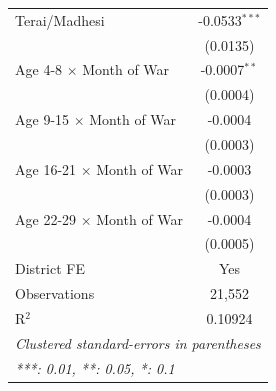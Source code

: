 \begin{tabular}{lc}
   Terai/Madhesi                    & -0.0533$^{***}$\\   
                                                     & (0.0135)\\   
   Age 4-8 $\times$ Month of War     & -0.0007$^{**}$\\   
                                                     & (0.0004)\\   
   Age 9-15 $\times$ Month of War     & -0.0004\\   
                                                     & (0.0003)\\   
   Age 16-21 $\times$ Month of War     & -0.0003\\   
                                                     & (0.0003)\\   
   Age 22-29 $\times$ Month of War     & -0.0004\\   
                                                     & (0.0005)\\   
   \midrule
   District  FE                                            & Yes\\  
   \midrule
   Observations                                      & 21,552\\  
   R$^2$                                             & 0.10924\\  
   \midrule \midrule
   \multicolumn{2}{l}{\emph{Clustered standard-errors in parentheses}}\\
   \multicolumn{2}{l}{\emph{ ***: 0.01, **: 0.05, *: 0.1}}\\
\end{tabular}
\par\endgroup
